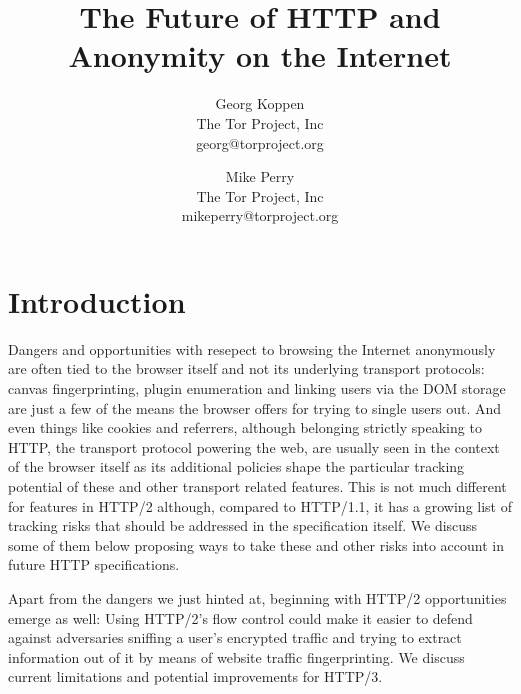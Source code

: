 \documentclass[letterpaper,11pt]{llncs}
\begin{document}
\title{The Future of HTTP and Anonymity on the Internet}

\author{Georg Koppen \\ The Tor Project, Inc \\ georg@torproject.org}
\author{Mike Perry \\ The Tor Project, Inc \\ mikeperry@torproject.org}


\maketitle
\pagestyle{plain}

\begin{abstract}


\end{abstract}
 

\section{Introduction}



Dangers and opportunities with resepect to browsing the Internet anonymously are
often tied to the browser itself and not its underlying transport protocols:
canvas fingerprinting, plugin enumeration and linking users via the DOM storage
are just a few of the means the browser offers for trying to single users out.
And even things like cookies and referrers, although belonging strictly speaking
to HTTP, the transport protocol powering the web, are usually seen in the
context of the browser itself as its additional policies shape the particular
tracking potential of these and other transport related features.
This is not much different for features in HTTP/2 although, compared to
HTTP/1.1, it has a growing list of tracking risks that should be addressed in
the specification itself. We discuss some of them below proposing ways to take
these and other risks into account in future HTTP specifications.

Apart from the dangers we just hinted at, beginning with HTTP/2 opportunities
emerge as well: Using HTTP/2's flow control could make it easier to defend
against adversaries sniffing a user's encrypted traffic and trying to extract
information out of it by means of website traffic fingerprinting. We discuss
current limitations and potential improvements for HTTP/3.
\end{document}
